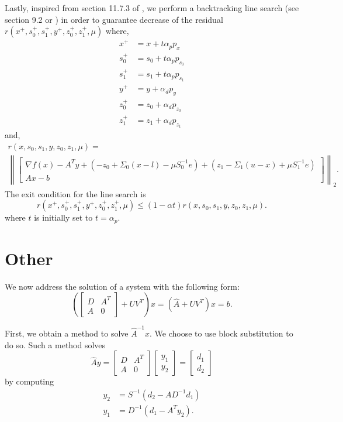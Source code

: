 \documentclass{article}
\begin{document}
Lastly, inspired from section 11.7.3 of \cite{BL04}, 
    we perform a backtracking line search (see section 9.2 or \cite{BL04})
    in order to guarantee decrease of the residual
    $r(x^+, s_0^+, s_1^+, y^+, z_0^+, z_1^+, \mu)$ where,
    \begin{align*}
    x^+ &= x + t \alpha_p p_x \\
    s_0^+ &= s_0+t \alpha_p p_{s_0} \\
    s_1^+ &= s_1+t \alpha_p p_{s_1} \\
    y^+ &= y +\alpha_d p_y \\
    z_0^+ &= z_0 + \alpha_d p_{z_0} \\
    z_1^+ &= z_1+\alpha_d p_{z_1} 
    \end{align*}
    and,
\begin{multline}
    r(x, s_0, s_1, y, z_0, z_1, \mu) = \\
\left\|
\begin{bmatrix}
    \nabla f(x) - A^T y + (-z_0 + \Sigma_0 (x - l) - \mu S_0^{-1} e) 
                        + (z_1 - \Sigma_1 (u - x) + \mu S_1^{-1} e) \\
    A x - b
\end{bmatrix}\right\|_2.
\end{multline}
The exit condition for the line search is 
    \begin{equation} r(x^+, s_0^+, s_1^+, y^+, z_0^+, z_1^+, \mu) \le
    (1-\alpha t) r(x, s_0, s_1, y, z_0, z_1, \mu).
    \end{equation}
where $t$ is initially set to $t = \alpha_p$.

\section{Other}
We now address the solution of a system with the following form:
\begin{equation}
    \left(\begin{bmatrix} D & A^T \\ A & 0 \end{bmatrix} + UV^T\right)x = 
    (\hat{A} + UV^T)x = b. \label{eq:main}
\end{equation}

First, we obtain a method to solve $\hat{A}^{-1} x$.
We choose to use block substitution to do so. 
Such a method solves 
\begin{equation}
    \hat{A}y = 
    \begin{bmatrix} D & A^T \\ A & 0 \end{bmatrix}
    \begin{bmatrix} y_1 \\ y_2 \end{bmatrix} = 
    \begin{bmatrix} d_1 \\ d_2 \end{bmatrix}
\end{equation}
by computing
\begin{align}
    y_2 &= S^{-1} (d_2 - A D^{-1} d_1) \\
    y_1 &= D^{-1} ( d_1 - A^T y_2).
\end{align}
\end{document}
